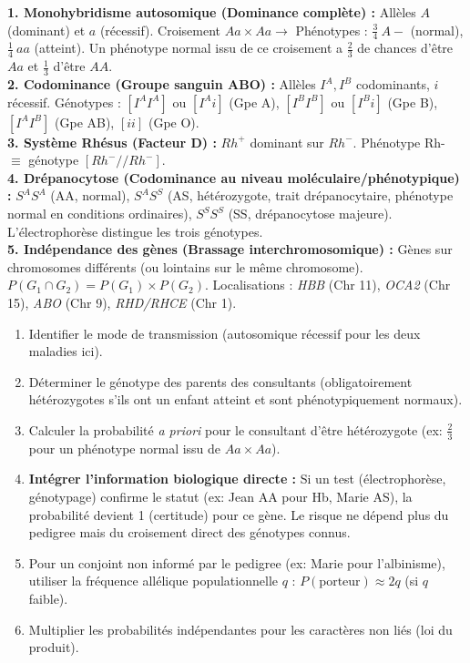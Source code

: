 \documentclass[11pt]{article}
\newcounter{popsec}
\newcounter{popsub}
\newcommand{\courssub}[1]{%
  \stepcounter{popsub}%
  \par\vspace{9pt}\noindent{\popxbold\fontsize{11.5}{13}\selectfont\color{popink}{\color{poporange}\thepopsec.\thepopsub}\hspace{6pt}#1}\par\nopagebreak\vspace{4pt}
}
\begin{document}
\courssub{Ressources à mobiliser}
\begin{propriete}
\textbf{1. Monohybridisme autosomique (Dominance complète) :} Allèles $A$ (dominant) et $a$ (récessif). Croisement $Aa \times Aa \rightarrow$ Phénotypes : $\frac{3}{4}\ A-$ (normal), $\frac{1}{4}\ aa$ (atteint). Un phénotype normal issu de ce croisement a $\frac{2}{3}$ de chances d'être $Aa$ et $\frac{1}{3}$ d'être $AA$.\\[4pt]
\textbf{2. Codominance (Groupe sanguin ABO) :} Allèles $I^A, I^B$ codominants, $i$ récessif. Génotypes : $[I^A I^A]$ ou $[I^A i]$ (Gpe A), $[I^B I^B]$ ou $[I^B i]$ (Gpe B), $[I^A I^B]$ (Gpe AB), $[ii]$ (Gpe O).\\[4pt]
\textbf{3. Système Rhésus (Facteur D) :} $Rh^+$ dominant sur $Rh^-$. Phénotype Rh- $\equiv$ génotype $[Rh^-//Rh^-]$.\\[4pt]
\textbf{4. Drépanocytose (Codominance au niveau moléculaire/phénotypique) :} $S^A S^A$ (AA, normal), $S^A S^S$ (AS, hétérozygote, trait drépanocytaire, phénotype normal en conditions ordinaires), $S^S S^S$ (SS, drépanocytose majeure). L'électrophorèse distingue les trois génotypes.\\[4pt]
\textbf{5. Indépendance des gènes (Brassage interchromosomique) :} Gènes sur chromosomes différents (ou lointains sur le même chromosome). $P(G_1 \cap G_2) = P(G_1) \times P(G_2)$. Localisations : \emph{HBB} (Chr 11), \emph{OCA2} (Chr 15), \emph{ABO} (Chr 9), \emph{RHD/RHCE} (Chr 1).
\end{propriete}

\begin{methode}
\begin{enumerate}
    \item Identifier le mode de transmission (autosomique récessif pour les deux maladies ici).
    \item Déterminer le génotype des parents des consultants (obligatoirement hétérozygotes s'ils ont un enfant atteint et sont phénotypiquement normaux).
    \item Calculer la probabilité \emph{a priori} pour le consultant d'être hétérozygote (ex: $\frac{2}{3}$ pour un phénotype normal issu de $Aa \times Aa$).
    \item \textbf{Intégrer l'information biologique directe :} Si un test (électrophorèse, génotypage) confirme le statut (ex: Jean AA pour Hb, Marie AS), la probabilité devient 1 (certitude) pour ce gène. Le risque ne dépend plus du pedigree mais du croisement direct des génotypes connus.
    \item Pour un conjoint non informé par le pedigree (ex: Marie pour l'albinisme), utiliser la fréquence allélique populationnelle $q$ : $P(\text{porteur}) \approx 2q$ (si $q$ faible).
    \item Multiplier les probabilités indépendantes pour les caractères non liés (loi du produit).
\end{enumerate}
\end{methode}
\end{document}

